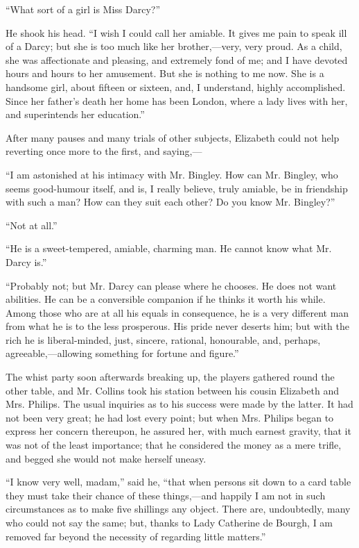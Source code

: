 \documentclass[12pt]{book}
\begin{document}
``What sort of a girl is Miss Darcy?''

He shook his head. ``I wish I could call her amiable. It gives me pain to speak ill of a Darcy; but she is too much like her brother,---very, very proud. As a child, she was affectionate and pleasing, and extremely fond of me; and I have devoted hours and hours to her amusement. But she is nothing to me now. She is a handsome girl, about fifteen or sixteen, and, I understand, highly accomplished. Since her father's death her home has been London, where a lady lives with her, and superintends her education.''

After many pauses and many trials of other subjects, Elizabeth could not help reverting once more to the first, and saying,---

``I am astonished at his intimacy with Mr. Bingley. How can Mr. Bingley, who seems good-humour itself, and is, I really believe, truly amiable, be in friendship with such a man? How can they suit each other? Do you know Mr. Bingley?''

``Not at all.''

``He is a sweet-tempered, amiable, charming man. He cannot know what Mr. Darcy is.''

``Probably not; but Mr. Darcy can please where he chooses. He does not want abilities. He can be a conversible companion if he thinks it worth his while. Among those who are at all his equals in consequence, he is a very different man from what he is to the less prosperous. His pride never deserts him; but with the rich he is liberal-minded, just, sincere, rational, honourable, and, perhaps, agreeable,---allowing something for fortune and figure.''

The whist party soon afterwards breaking up, the players gathered round the other table, and Mr. Collins took his station between his cousin Elizabeth and Mrs. Philips. The usual inquiries as to his success were made by the latter. It had not been very great; he had lost every point; but when Mrs. Philips began to express her concern thereupon, he assured her, with much earnest gravity, that it was not of the least importance; that he considered the money as a mere trifle, and begged she would not make herself uneasy.

``I know very well, madam,'' said he, ``that when persons sit down to a card table they must take their chance of these things,---and happily I am not in such circumstances as to make five shillings any object. There are, undoubtedly, many who could not say the same; but, thanks to Lady Catherine de Bourgh, I am removed far beyond the necessity of regarding little matters.''
\end{document}
